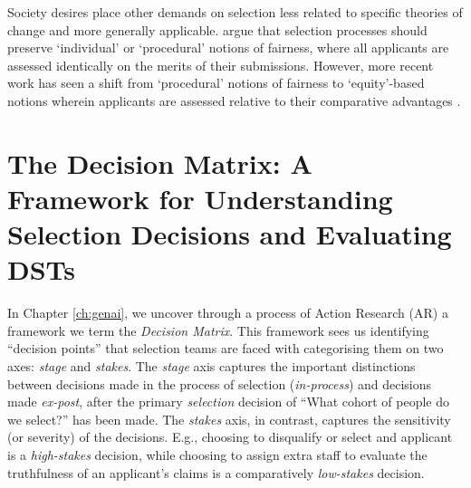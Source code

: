 Society desires place other demands on selection less related to specific theories of change and more generally applicable. \textcite{dwork_fairness_2012} argue that selection processes should preserve `individual' or `procedural' notions of fairness, where all applicants are assessed identically on the merits of their submissions. However, more recent work has seen a shift from `procedural' notions of fairness to `equity'-based notions wherein applicants are assessed relative to their comparative advantages \cite{Ahnaf2023AHPAP}.

\section{The Decision Matrix: A Framework for Understanding Selection Decisions and Evaluating DSTs}
In Chapter \ref{ch:genai}, we uncover through a process of Action Research (AR) a framework we term the \emph{Decision Matrix}. This framework sees us identifying ``decision points'' that selection teams are faced with categorising them on two axes: \emph{stage} and \emph{stakes}. The \emph{stage} axis captures the important distinctions between decisions made in the process of selection (\emph{in-process}) and decisions made \emph{ex-post}, after the primary \emph{selection} decision of ``What cohort of people do we select?'' has been made. The \emph{stakes} axis, in contrast, captures the sensitivity (or severity) of the decisions. E.g., choosing to disqualify or select and applicant is a \emph{high-stakes} decision, while choosing to assign extra staff to evaluate the truthfulness of an applicant's claims is a comparatively \emph{low-stakes} decision.

